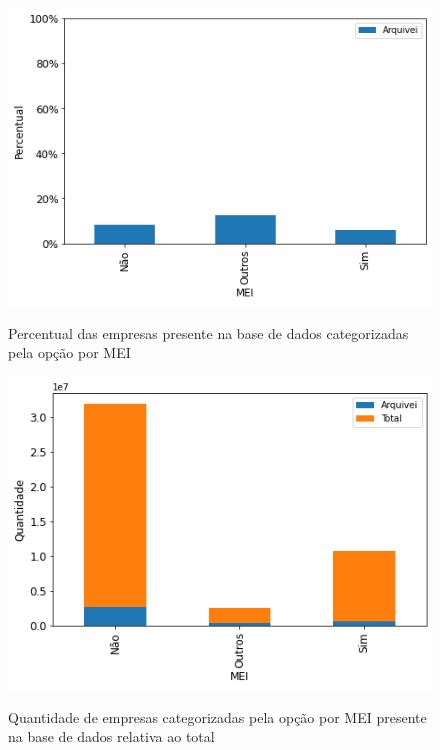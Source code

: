 \begin{figure}[htb]
    \centering
    \caption{Percentual das empresas presente na base de dados categorizadas pela opção por MEI}
    \includegraphics[scale=0.7]{images/base-de-dados-5.1-presenca-por-mei.png}
    \label{fig:base-de-dados:descritiva-5.1-presenca-por-mei}
    \fautor
\end{figure}

\begin{figure}[htb]
    \centering
    \caption{Quantidade de empresas categorizadas pela opção por MEI presente na base de dados relativa ao total}
    \includegraphics[scale=0.7]{images/base-de-dados-5.2-qtde-por-mei.png}
    \label{fig:base-de-dados:descritiva-5.2-qtde-por-mei}
    \fautor
\end{figure}

